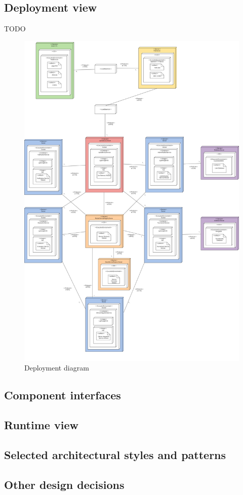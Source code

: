 \subsection{Deployment view}
TODO
\begin{figure}[H]
    \centering
    \vspace{-4cm}
    \hspace{1cm}
    \includegraphics[width=1.1\textwidth]{Diagrams/deployment_diagram.png}
    \caption{Deployment diagram}
    \label{deployment_diagram}
\end{figure}

\subsection{Component interfaces}
\subsection{Runtime view}
\subsection{Selected architectural styles and patterns}
\subsection{Other design decisions}